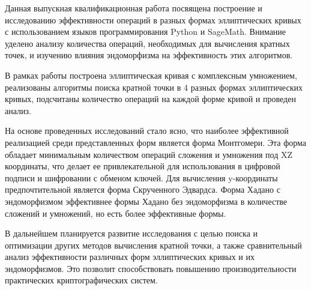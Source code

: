 Данная выпускная квалификационная работа посвящена построение и исследованию эффективности операций в разных формах эллиптических кривых с использованием языков программирования Python и SageMath. Внимание уделено анализу количества операций, необходимых для вычисления кратных точек, и изучению влияния эндоморфизма на эффективность этих алгоритмов.

В рамках работы построена эллиптическая кривая с комплексным умножением, реализованы алгоритмы поиска кратной точки в 4 разных формах эллиптических кривых, подсчитаны количество операций на каждой форме кривой и проведен анализ.

На основе проведенных исследований стало ясно, что наиболее эффективной реализацией среди представленных форм является форма Монтгомери. Эта форма обладает минимальным количеством операций сложения и умножения под XZ координаты, что делает ее привлекательной для использования в цифровой подписи и шифровании с обменом ключей.
Для вычисления y-координаты предпочтительной является форма Скрученного Эдвардса. Форма Хадано с эндоморфизмом эффективнее формы Хадано без эндоморфизма в количестве сложений и умножений, но есть более эффективные формы. 

В дальнейшем планируется развитие исследования с целью поиска и оптимизации других методов вычисления кратной точки, а также сравнительный анализ эффективности различных форм эллиптических кривых и их эндоморфизмов. Это позволит способствовать повышению производительности практических криптографических систем.

